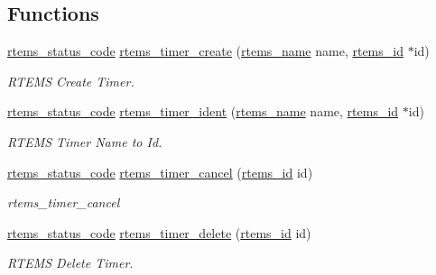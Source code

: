 \subsection*{Functions}
\begin{DoxyCompactItemize}
\item 
\mbox{\hyperlink{group__ClassicStatus_ga545d41846817eaba6143d52ee4d9e9fe}{rtems\+\_\+status\+\_\+code}} \mbox{\hyperlink{group__ClassicTimer_ga57cf664e958961aefdb8ef8440f23afa}{rtems\+\_\+timer\+\_\+create}} (\mbox{\hyperlink{group__ClassicTasks_ga55fb63c49f68c0cbd9bee004da15b1fd}{rtems\+\_\+name}} name, \mbox{\hyperlink{group__ClassicTasks_gab20892b814dced7dd4e5b9bf42becd57}{rtems\+\_\+id}} $\ast$id)
\begin{DoxyCompactList}\small\item\em R\+T\+E\+MS Create Timer. \end{DoxyCompactList}\item 
\mbox{\hyperlink{group__ClassicStatus_ga545d41846817eaba6143d52ee4d9e9fe}{rtems\+\_\+status\+\_\+code}} \mbox{\hyperlink{group__ClassicTimer_ga87badde45edc7172226ec2904b11ce6c}{rtems\+\_\+timer\+\_\+ident}} (\mbox{\hyperlink{group__ClassicTasks_ga55fb63c49f68c0cbd9bee004da15b1fd}{rtems\+\_\+name}} name, \mbox{\hyperlink{group__ClassicTasks_gab20892b814dced7dd4e5b9bf42becd57}{rtems\+\_\+id}} $\ast$id)
\begin{DoxyCompactList}\small\item\em R\+T\+E\+MS Timer Name to Id. \end{DoxyCompactList}\item 
\mbox{\hyperlink{group__ClassicStatus_ga545d41846817eaba6143d52ee4d9e9fe}{rtems\+\_\+status\+\_\+code}} \mbox{\hyperlink{group__ClassicTimer_ga746671597de779ad02b9ca72facc9e92}{rtems\+\_\+timer\+\_\+cancel}} (\mbox{\hyperlink{group__ClassicTasks_gab20892b814dced7dd4e5b9bf42becd57}{rtems\+\_\+id}} id)
\begin{DoxyCompactList}\small\item\em rtems\+\_\+timer\+\_\+cancel \end{DoxyCompactList}\item 
\mbox{\hyperlink{group__ClassicStatus_ga545d41846817eaba6143d52ee4d9e9fe}{rtems\+\_\+status\+\_\+code}} \mbox{\hyperlink{group__ClassicTimer_ga582cf1f171214dabcc2af8c5bd48898f}{rtems\+\_\+timer\+\_\+delete}} (\mbox{\hyperlink{group__ClassicTasks_gab20892b814dced7dd4e5b9bf42becd57}{rtems\+\_\+id}} id)
\begin{DoxyCompactList}\small\item\em R\+T\+E\+MS Delete Timer. \end{DoxyCompactList}\item 

\end{DoxyCompactItemize}
